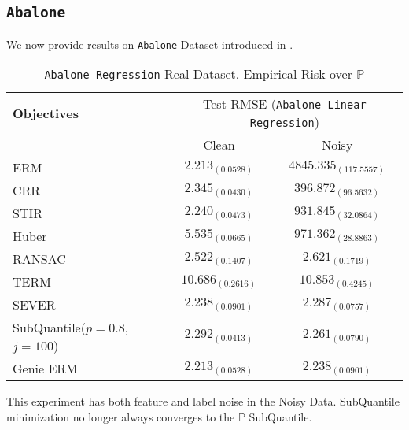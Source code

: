 \documentclass{article} %
\newcommand{\subhead}[1]{\multicolumn{1}{c}{#1}}%
\begin{document}
\begin{appendices}
	\subsection{\texttt{Abalone}}
	We now provide results on \texttt{Abalone} Dataset introduced in \cite{Dua2019}.
	\begin{table}[!h]
		\centering
		\begin{tabular}{lcc}
			\toprule 
			\textbf{Objectives}&\multicolumn{2}{c}{Test RMSE (\texttt{Abalone Linear Regression})}\\                   
			\cmidrule(rl){2-3}
			&\subhead{Clean}& \subhead{Noisy}\\ 
			\midrule
			ERM  &$2.213_{(0.0528)}$&$4845.335_{(117.5557)}$\\
			CRR \cite{bhatia2017}  &$2.345_{(0.0430)}$&$396.872_{(96.5632)}$\\
			STIR \cite{pmlr-v89-mukhoty19a}  &$2.240_{(0.0473)}$&$931.845_{(32.0864)}$\\
			Huber \cite{Huber2009} &$5.535_{(0.0665)}$&$971.362_{(28.8863)}$\\
			RANSAC \cite{RANSAC1981} &$2.522_{(0.1407)}$&$2.621_{(0.1719)}$\\
			TERM \cite{li2020tilted} &$10.686_{(0.2616)}$&$10.853_{(0.4245)}$\\
			SEVER \cite{DiakonikolasKKLSS19} &$\mathbf{2.238_{(0.0901)}}$&$\mathbf{2.287_{(0.0757)}}$\\
			\rowcolor{LightCyan}
			SubQuantile($p = 0.8$,$j = 100$) &$\mathbf{2.292_{(0.0413)}}$&$\mathbf{2.261_{(0.0790)}}$\\
			\midrule 
			Genie ERM &$2.213_{(0.0528)}$&$2.238_{(0.0901)}$\\
			\bottomrule
		\end{tabular}
		\caption{\texttt{Abalone Regression} Real Dataset. Empirical Risk over $\mathbb{P}$}
		\label{tab:abalone-regression}
	\end{table}
	This experiment has both feature and label noise in the Noisy Data. SubQuantile minimization no longer always converges to the $\mathbb{P}$ SubQuantile.
	

\end{appendices}
\end{document}

